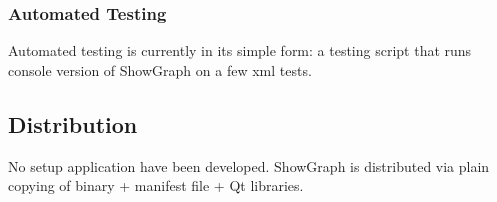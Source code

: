 \documentclass[11pt,twoside,a4paper]{article}
\begin{document}
\subsubsection{Automated Testing}
Automated testing is currently in its simple form: a testing script that runs console version of ShowGraph on a few xml tests.

\subsection{Distribution}
No setup application have been developed. ShowGraph is distributed via plain copying of binary + manifest file + Qt libraries.
\end{document}
